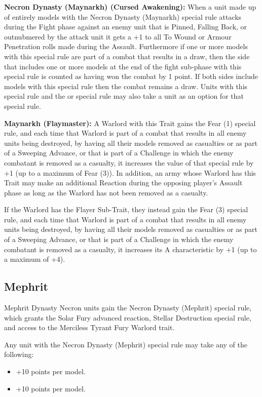 \begin{multicols}{2}
\textbf{Necron Dynasty (Maynarkh) (Cursed Awakening):} When a unit made up of entirely models with the Necron Dynasty (Maynarkh) special rule attacks during the Fight phase against an enemy unit that is Pinned, Falling Back, or outnubmered by the attack unit it gets a +1 to all To Wound or Armour Penetration rolls made during the Assault. Furthermore if one or more models with this special rule are part of a combat that results in a draw, then the side that includes one or more models at the end of the fight sub-phase with this special rule is counted as having won the combat by 1 point. If both sides include models with this special rule then the combat remains a draw. Units with this special rule and the  or  special rule may also take a  unit as an option for that special rule.

\textbf{Maynarkh (Flaymaster):} A Warlord with this Trait gains the Fear (1) special rule, and each time that Warlord is part of a combat that results in all enemy units being destroyed, by having all their models removed as casualties or as part of a Sweeping Advance, or that is part of a Challenge in which the enemy combatant is removed as a casualty, it increases the value of that special rule by +1 (up to a maximum of Fear (3)). In addition, an army whose Warlord has this Trait may make an additional Reaction during the opposing player’s Assault phase as long as the Warlord has not been removed as a casualty.

If the Warlord has the Flayer Sub-Trait, they instead gain the Fear (3) special rule, and each time that Warlord is part of a combat that results in all enemy units being destroyed, by having all their models removed as casualties or as part of a Sweeping Advance, or that is part of a Challenge in which the enemy combatant is removed as a casualty, it increases its A characteristic by +1 (up to a maximum of +4).


\newpage
\subsection{Mephrit}

Mephrit Dynasty Necron units gain the Necron Dynasty (Mephrit) special rule, which grants the Solar Fury advanced reaction, Stellar Destruction special rule, and access to the Merciless Tyrant Fury Warlord trait.

Any unit with the Necron Dynasty (Mephrit) special rule may take any of the following:
\begin{itemize}
	\item {} \dotfill +10 points per model.
	\item {} \dotfill +10 points per model.
\end{itemize}


\end{multicols}
